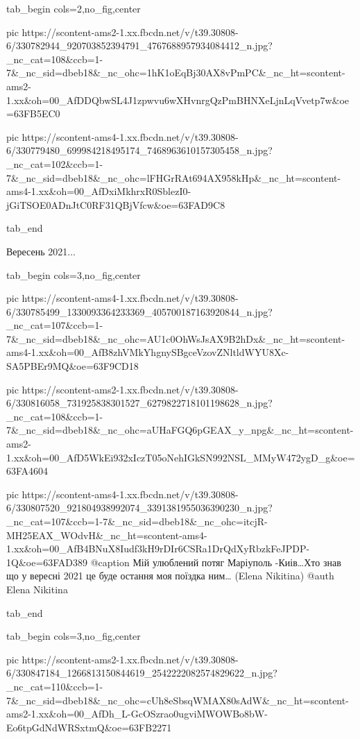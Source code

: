 \begin{center}
\begin{minipage}{\textwidth}

\ifcmt
  tab_begin cols=2,no_fig,center

     pic https://scontent-ams2-1.xx.fbcdn.net/v/t39.30808-6/330782944_920703852394791_4767688957934084412_n.jpg?_nc_cat=108&ccb=1-7&_nc_sid=dbeb18&_nc_ohc=1hK1oEqBj30AX8vPmPC&_nc_ht=scontent-ams2-1.xx&oh=00_AfDDQbwSL4J1zpwvu6wXHvnrgQzPmBHNXeLjnLqVvetp7w&oe=63FB5EC0

     pic https://scontent-ams4-1.xx.fbcdn.net/v/t39.30808-6/330779480_699984218495174_7468963610157305458_n.jpg?_nc_cat=102&ccb=1-7&_nc_sid=dbeb18&_nc_ohc=lFHGrRAt694AX958kHp&_nc_ht=scontent-ams4-1.xx&oh=00_AfDxiMkhrxR0SblezI0-jGiTSOE0ADnJtC0RF31QBjVfcw&oe=63FAD9C8

  tab_end
\fi


Вересень 2021...


\ifcmt
  tab_begin cols=3,no_fig,center

     pic https://scontent-ams4-1.xx.fbcdn.net/v/t39.30808-6/330785499_1330093364233369_405700187163920844_n.jpg?_nc_cat=107&ccb=1-7&_nc_sid=dbeb18&_nc_ohc=AU1c0OhWsJsAX9B2hDx&_nc_ht=scontent-ams4-1.xx&oh=00_AfB8zhVMkYhgnySBgceVzovZNltldWYU8Xc-SA5PBEr9MQ&oe=63F9CD18

     pic https://scontent-ams2-1.xx.fbcdn.net/v/t39.30808-6/330816058_731925838301527_6279822718101198628_n.jpg?_nc_cat=108&ccb=1-7&_nc_sid=dbeb18&_nc_ohc=aUHaFGQ6pGEAX_y_npg&_nc_ht=scontent-ams2-1.xx&oh=00_AfD5WkEi932xIczT05oNehIGkSN992NSL_MMyW472ygD_g&oe=63FA4604

     pic https://scontent-ams4-1.xx.fbcdn.net/v/t39.30808-6/330807520_921804938992074_3391381955036390230_n.jpg?_nc_cat=107&ccb=1-7&_nc_sid=dbeb18&_nc_ohc=itcjR-MH25EAX_WOdvH&_nc_ht=scontent-ams4-1.xx&oh=00_AfB4BNuX8Iudf3kH9rDIr6CSRa1DrQdXyRbzkFeJPDP-1Q&oe=63FAD389
     @caption Мій улюблений потяг Маріуполь -Киів…Хто знав що у вересні 2021 це буде остання моя поїздка ним… (Elena Nikitina)
     @auth Elena Nikitina

  tab_end
\fi

\end{minipage}
\end{center}


\ifcmt
  tab_begin cols=3,no_fig,center

     pic https://scontent-ams2-1.xx.fbcdn.net/v/t39.30808-6/330847184_1266813150844619_2542222082574829622_n.jpg?_nc_cat=110&ccb=1-7&_nc_sid=dbeb18&_nc_ohc=cUh8eSbsqWMAX80sAdW&_nc_ht=scontent-ams2-1.xx&oh=00_AfDh_L-GcOSzrao0ugviMWOWBo8bW-Eo6tpGdNdWRSxtmQ&oe=63FB2271

